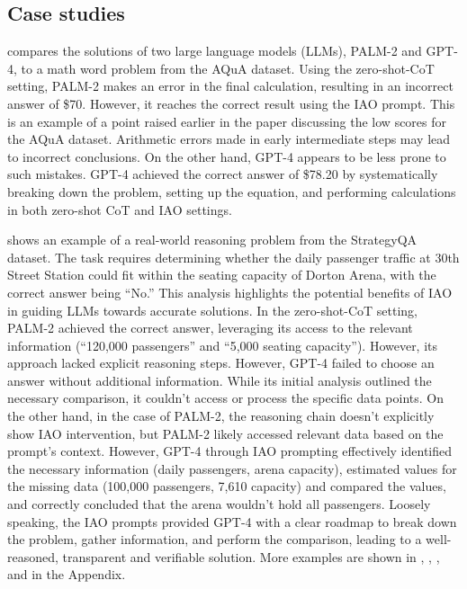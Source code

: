 \subsection{Case studies}

 compares the solutions of two large language models (LLMs), PALM-2 and GPT-4, to a math word problem from the AQuA dataset. Using the zero-shot-CoT setting, PALM-2 makes an error in the final calculation, resulting in an incorrect answer of \$70. However, it reaches the correct result using the IAO prompt. This is an example of a point raised earlier in the paper discussing the low scores for the AQuA dataset. Arithmetic errors made in early intermediate steps may lead to incorrect conclusions. On the other hand, GPT-4 appears to be less prone to such mistakes. GPT-4 achieved the correct answer of \$78.20 by systematically breaking down the problem, setting up the equation, and performing calculations in both zero-shot CoT and IAO settings. 

 shows an example of a real-world reasoning problem from the StrategyQA dataset. The task requires determining whether the daily passenger traffic at 30th Street Station could fit within the seating capacity of Dorton Arena, with the correct answer being ``No.'' This analysis highlights the potential benefits of IAO in guiding LLMs towards accurate solutions. In the zero-shot-CoT setting, PALM-2 achieved the correct answer, leveraging its access to the relevant information (``120,000 passengers'' and ``5,000 seating capacity''). However, its approach lacked explicit reasoning steps. However, GPT-4 failed to choose an answer without additional information. While its initial analysis outlined the necessary comparison, it couldn't access or process the specific data points. On the other hand, in the case of PALM-2, the reasoning chain doesn't explicitly show IAO intervention, but PALM-2 likely accessed relevant data based on the prompt's context. However, GPT-4 through IAO prompting effectively identified the necessary information (daily passengers, arena capacity), estimated values for the missing data (100,000 passengers, 7,610 capacity) and compared the values, and correctly concluded that the arena wouldn't hold all passengers. Loosely speaking, the IAO prompts provided GPT-4 with a clear roadmap to break down the problem, gather information, and perform the comparison, leading to a well-reasoned, transparent and verifiable solution.
More examples are shown in , , ,  and  in the Appendix. 


